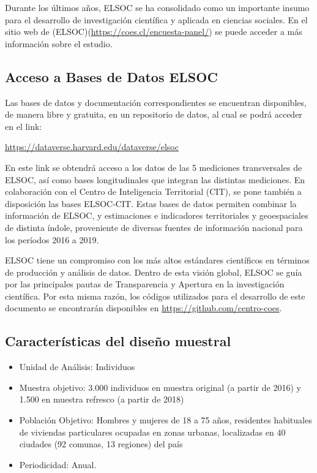 \documentclass[
  12pt,
]{book}
\begin{document}
Durante los últimos años, ELSOC se ha consolidado como un importante insumo para el desarrollo de investigación científica y aplicada en ciencias sociales. En el sitio web de (ELSOC)(\url{https://coes.cl/encuesta-panel/}) se puede acceder a más información sobre el estudio.

\hypertarget{acceso-a-bases-de-datos-elsoc}{%
\subsection{Acceso a Bases de Datos ELSOC}\label{acceso-a-bases-de-datos-elsoc}}

Las bases de datos y documentación correspondientes se encuentran disponibles, de manera libre y gratuita, en un repositorio de datos, al cual se podrá acceder en el link:

\url{https://dataverse.harvard.edu/dataverse/elsoc}

En este link se obtendrá acceso a los datos de las 5 mediciones transversales de ELSOC, así como bases longitudinales que integran las distintas mediciones. En colaboración con el Centro de Inteligencia Territorial (CIT), se pone también a disposición las bases ELSOC-CIT. Estas bases de datos permiten combinar la información de ELSOC, y estimaciones e indicadores territoriales y geoespaciales de distinta índole, proveniente de diversas fuentes de información nacional para los períodos 2016 a 2019.

ELSOC tiene un compromiso con los más altos estándares científicos en términos de producción y análisis de datos. Dentro de esta visión global, ELSOC se guía por las principales pautas de Transparencia y Apertura en la investigación científica. Por esta misma razón, los códigos utilizados para el desarrollo de este documento se encontrarán disponibles en \url{https://github.com/centro-coes}.

\hypertarget{caracteruxedsticas-del-diseuxf1o-muestral}{%
\subsection{Características del diseño muestral}\label{caracteruxedsticas-del-diseuxf1o-muestral}}

\begin{itemize}
\item
  Unidad de Análisis: Individuos
\item
  Muestra objetivo: 3.000 individuos en muestra original (a partir de 2016) y 1.500 en muestra refresco (a partir de 2018)
\item
  Población Objetivo: Hombres y mujeres de 18 a 75 años, residentes habituales de viviendas particulares ocupadas en zonas urbanas, localizadas en 40 ciudades (92 comunas, 13 regiones) del país
\item
  Periodicidad: Anual.
\end{itemize}
\end{document}
